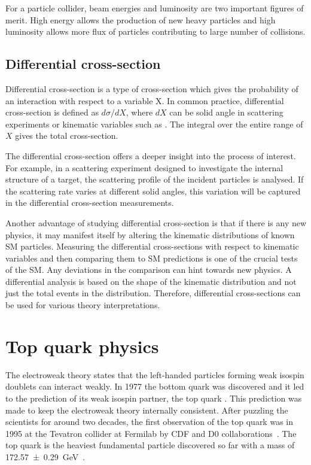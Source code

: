 For a particle collider, beam energies and luminosity are two important figures of merit. 
High energy allows the production of new heavy particles and high luminosity allows more flux 
of particles contributing to large number of collisions.

\subsection*{Differential cross-section}
Differential cross-section is a type of cross-section which gives the probability of an interaction
with respect to a variable X. In common practice, differential cross-section is defined as $d\sigma/dX$,
where $dX$ can be solid angle in scattering experiments or kinematic variables such as \pT. The 
integral over the entire range of $X$ gives the total cross-section. 

The differential cross-section offers a deeper insight into the process of interest. For example, in a 
scattering experiment designed to investigate the internal structure of a target, the scattering 
profile of the incident particles is analysed. If the scattering rate varies at different solid angles,
 this variation will be captured in the differential cross-section measurements. 

Another advantage of studying differential cross-section is that if there is any new physics,
it may manifest itself by altering the kinematic distributions of known SM particles. Measuring the 
differential cross-sections with respect to kinematic variables and then comparing them to SM predictions
is one of the crucial tests of the SM. Any deviations in the comparison can hint towards new physics.
A differential analysis is based on the shape of the kinematic distribution and not just the 
total events in the distribution. Therefore, differential cross-sections can be used for various
theory interpretations.

\section{Top quark physics}
The electroweak theory states that the left-handed particles forming weak isospin doublets can
interact weakly. In 1977 the bottom quark was discovered and it led to the prediction of its weak 
isospin partner, the top quark \Ptop. This prediction was made to keep the electroweak theory internally
consistent. After puzzling the scientists for around two decades,
the first observation of the top quark was in 1995 at the Tevatron collider at Fermilab by
CDF and D0 collaborations~\cite{PhysRevLett.74.2626,PhysRevLett.74.2632}.
The top quark is the heaviest fundamental particle discovered so far with a mass of 
\SI{172.57 \pm 0.29}{\GeV}~\cite{Navas:2024zbs}.

